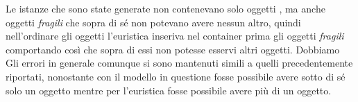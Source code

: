 Le istanze che sono state generate non contenevano solo oggetti , ma anche oggetti \textit{fragili} che sopra di sé non potevano avere nessun altro, quindi nell'ordinare gli oggetti l'euristica inseriva nel container prima gli oggetti \textit{fragili} comportando così che sopra di essi non potesse esservi altri oggetti. Dobbiamo Gli errori in generale comunque si sono mantenuti simili a quelli precedentemente riportati, nonostante con il modello in questione fosse possibile avere sotto di sé solo un oggetto mentre per l'euristica fosse possibile avere più di un oggetto.